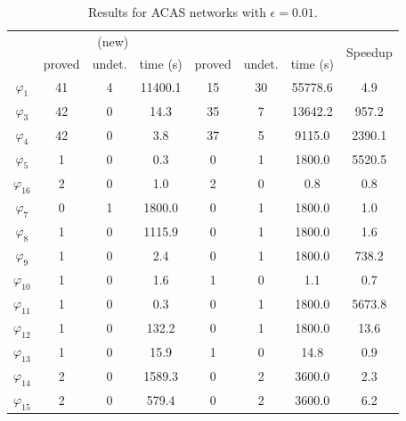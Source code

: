 \begin{table}
	\centering
\caption{Results for ACAS networks with $ \epsilon = 0.01 $.}
\label{neurodiff:tbl:acas_new}
		\begin{tabular}{|c|ccc|ccc|c|}\hline
			\multirow{2}{*}{\makecell[c]{Property}} &  \multicolumn{3}{c|}{\Name{} (new)}
			& \multicolumn{3}{c|}{\ReluDiffP{}} & \multirow{2}{*}{Speedup} \\
			\cline{2-7}
			& proved  & undet. & time (s) & proved & undet. & time (s) &  \\\hline
			\hline

        $\varphi_{1}$   & 41    & 4     & 11400.1       & 15    & 30    & 55778.6       &   4.9         \\\hline
$\varphi_{3}$   & 42    & 0     &  14.3         & 35    & 7     & 13642.2       & 957.2         \\\hline
$\varphi_{4}$   & 42    & 0     &   3.8         & 37    & 5     & 9115.0        & 2390.1        \\\hline
$\varphi_{5}$   & 1     & 0     &   0.3         & 0     & 1     & 1800.0        & 5520.5        \\\hline
$\varphi_{16}$  & 2     & 0     &   1.0         & 2     & 0     &   0.8         &   0.8         \\\hline
$\varphi_{7}$   & 0     & 1     & 1800.0        & 0     & 1     & 1800.0        &   1.0         \\\hline
$\varphi_{8}$   & 1     & 0     & 1115.9        & 0     & 1     & 1800.0        &   1.6         \\\hline
$\varphi_{9}$   & 1     & 0     &   2.4         & 0     & 1     & 1800.0        & 738.2         \\\hline
$\varphi_{10}$  & 1     & 0     &   1.6         & 1     & 0     &   1.1         &   0.7         \\\hline
$\varphi_{11}$  & 1     & 0     &   0.3         & 0     & 1     & 1800.0        & 5673.8        \\\hline
$\varphi_{12}$  & 1     & 0     & 132.2         & 0     & 1     & 1800.0        &  13.6         \\\hline
$\varphi_{13}$  & 1     & 0     &  15.9         & 1     & 0     &  14.8         &   0.9         \\\hline
$\varphi_{14}$  & 2     & 0     & 1589.3        & 0     & 2     & 3600.0        &   2.3         \\\hline
$\varphi_{15}$  & 2     & 0     & 579.4         & 0     & 2     & 3600.0        &   6.2         \\\hline

		\end{tabular}
\end{table}


